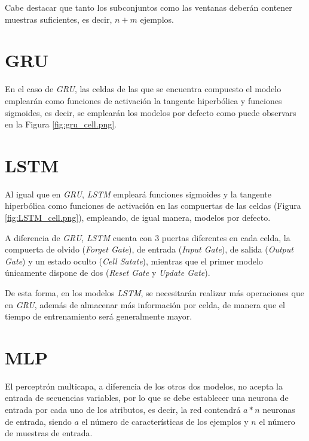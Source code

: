 Cabe destacar que tanto los subconjuntos como las ventanas deberán contener muestras 
suficientes, es decir, \(n + m\) ejemplos.

\newpage

\section{GRU}
En el caso de \textit{GRU}, las celdas de las que se encuentra compuesto el modelo 
emplearán como funciones de activación la tangente hiperbólica y funciones sigmoides, 
es decir, se emplearán los modelos por defecto como puede observars en la Figura 
\ref{fig:gru_cell.png}.


\section{LSTM}
Al igual que en \textit{GRU}, \textit{LSTM} empleará funciones sigmoides y la 
tangente hiperbólica como funciones de activación en las compuertas de las celdas (Figura \ref{fig:LSTM_cell.png}),
empleando, de igual manera, modelos por defecto.


A diferencia de \textit{GRU}, \textit{LSTM} cuenta con 3 puertas diferentes en cada celda, 
la compuerta de olvido (\textit{Forget Gate}), de entrada (\textit{Input Gate}), 
de salida (\textit{Output Gate}) y un estado oculto (\textit{Cell Satate}), mientras que 
el primer modelo únicamente dispone de dos (\textit{Reset Gate} y \textit{Update Gate}).

De esta forma, en los modelos \textit{LSTM}, se necesitarán realizar más operaciones
que en \textit{GRU}, además de almacenar más información por celda, 
de manera que el tiempo de entrenamiento será generalmente mayor.

\section{MLP}
El perceptrón multicapa, a diferencia de los otros dos modelos, no acepta
la entrada de secuencias variables, por lo que se debe establecer una neurona de entrada
por cada uno de los atributos, es decir, la red contendrá
\(a * n\) neuronas de entrada, siendo \(a\) el número de características de los ejemplos y
\(n\) el número de muestras de entrada.

